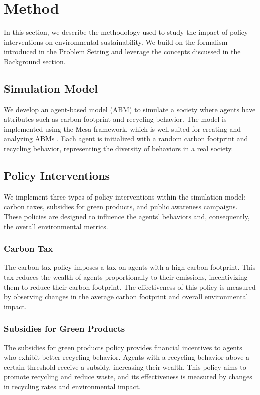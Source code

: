 \documentclass{article} %
\begin{document}
\section{Method}
\label{sec:method}

In this section, we describe the methodology used to study the impact of policy interventions on environmental sustainability. We build on the formalism introduced in the Problem Setting and leverage the concepts discussed in the Background section.

\subsection{Simulation Model}
We develop an agent-based model (ABM) to simulate a society where agents have attributes such as carbon footprint and recycling behavior. The model is implemented using the Mesa framework, which is well-suited for creating and analyzing ABMs \citep{poledna2023economic}. Each agent is initialized with a random carbon footprint and recycling behavior, representing the diversity of behaviors in a real society.

\subsection{Policy Interventions}
We implement three types of policy interventions within the simulation model: carbon taxes, subsidies for green products, and public awareness campaigns. These policies are designed to influence the agents' behaviors and, consequently, the overall environmental metrics.

\subsubsection{Carbon Tax}
The carbon tax policy imposes a tax on agents with a high carbon footprint. This tax reduces the wealth of agents proportionally to their emissions, incentivizing them to reduce their carbon footprint. The effectiveness of this policy is measured by observing changes in the average carbon footprint and overall environmental impact.

\subsubsection{Subsidies for Green Products}
The subsidies for green products policy provides financial incentives to agents who exhibit better recycling behavior. Agents with a recycling behavior above a certain threshold receive a subsidy, increasing their wealth. This policy aims to promote recycling and reduce waste, and its effectiveness is measured by changes in recycling rates and environmental impact.
\end{document}
